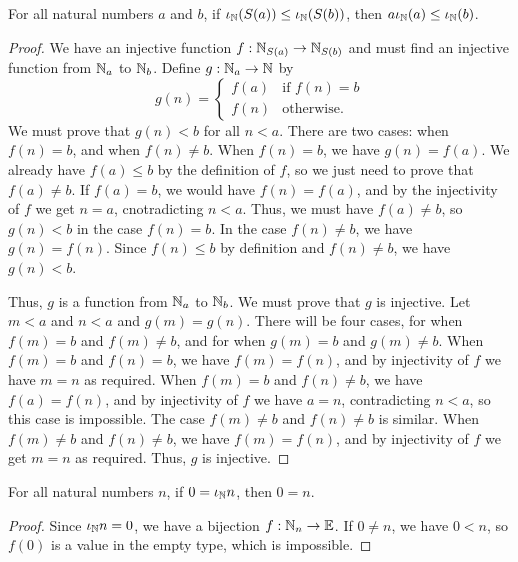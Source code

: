 \documentclass[../../math.tex]{subfiles}
\begin{document}
\begin{lemma} \label{from_nat_card_inj_lemma}
    For all natural numbers $a$ and $b$, if $\iota_{\mathbb{N}}(S(a)) \leq \iota_{\mathbb{N}}(S(b))$, then $a
    \iota_{\mathbb{N}}(a) \leq \iota_{\mathbb{N}}(b)$.
\end{lemma}
\begin{proof}
    We have an injective function $f : \mathbb{N}_{S(a)} \to \mathbb{N}_{S(b)}$ and must find an
    injective function from $\mathbb{N}_a$ to $\mathbb{N}_b$.  Define $g : \mathbb{N}_a \to \mathbb{N}$ by
    \[
        g(n) =
        \begin{cases}
            f(a) & \text{if $f(n) = b$} \\
            f(n) & \text{otherwise.}
        \end{cases}
    \]
    We must prove that $g(n) < b$ for all $n < a$.  There are two cases: when
    $f(n) = b$, and when $f(n) \neq b$.  When $f(n) = b$, we have $g(n) = f(a)$.
    We already have $f(a) \leq b$ by the definition of $f$, so we just need to
    prove that $f(a) \neq b$.  If $f(a) = b$, we would have $f(n) = f(a)$, and
    by the injectivity of $f$ we get $n = a$, cnotradicting $n < a$.  Thus, we
    must have $f(a) \neq b$, so $g(n) < b$ in the case $f(n) = b$.  In the case
    $f(n) \neq b$, we have $g(n) = f(n)$.  Since $f(n) \leq b$ by definition and
    $f(n) \neq b$, we have $g(n) < b$.

    Thus, $g$ is a function from $\mathbb{N}_a$ to $\mathbb{N}_b$.  We must prove that $g$ is
    injective.  Let $m < a$ and $n < a$ and $g(m) = g(n)$.  There will be four
    cases, for when $f(m) = b$ and $f(m) \neq b$, and for when $g(m) = b$ and
    $g(m) \neq b$.  When $f(m) = b$ and $f(n) = b$, we have $f(m) = f(n)$, and
    by injectivity of $f$ we have $m = n$ as required.  When $f(m) = b$ and
    $f(n) \neq b$, we have $f(a) = f(n)$, and by injectivity of $f$ we have $a =
    n$, contradicting $n < a$, so this case is impossible.  The case $f(m) \neq
    b$ and $f(n) \neq b$ is similar.  When $f(m) \neq b$ and $f(n) \neq b$, we
    have $f(m) = f(n)$, and by injectivity of $f$ we get $m = n$ as required.
    Thus, $g$ is injective.
\end{proof}

\begin{lemma} \label{from_nat_card_zero_eq}
    For all natural numbers $n$, if $0 = \iota_{\mathbb{N}} n$, then $0 = n$.
\end{lemma}
\begin{proof}
    Since $\iota_{\mathbb{N}} n = 0$, we have a bijection $f : \mathbb{N}_n \to \mathbb{E}$.  If $0 \neq n$, we
    have $0 < n$, so $f(0)$ is a value in the empty type, which is impossible.
\end{proof}
\end{document}
